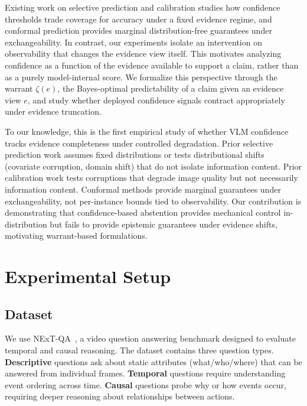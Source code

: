 \documentclass{article}
\begin{document}
Existing work on selective prediction and calibration studies how confidence thresholds trade coverage for accuracy under a fixed evidence regime, and conformal prediction provides marginal distribution-free guarantees under exchangeability. In contrast, our experiments isolate an intervention on observability that changes the evidence view itself. This motivates analyzing confidence as a function of the evidence available to support a claim, rather than as a purely model-internal score. We formalize this perspective through the warrant $\zeta(e)$, the Bayes-optimal predictability of a claim given an evidence view $e$, and study whether deployed confidence signals contract appropriately under evidence truncation.

To our knowledge, this is the first empirical study of whether VLM confidence tracks evidence completeness under controlled degradation. Prior selective prediction work assumes fixed distributions or tests distributional shifts (covariate corruption, domain shift) that do not isolate information content. Prior calibration work tests corruptions that degrade image quality but not necessarily information content. Conformal methods provide marginal guarantees under exchangeability, not per-instance bounds tied to observability. Our contribution is demonstrating that confidence-based abstention provides mechanical control in-distribution but fails to provide epistemic guarantees under evidence shifts, motivating warrant-based formulations.

\section{Experimental Setup}

\subsection{Dataset}

We use NExT-QA~\citep{nextqa}, a video question answering benchmark designed to evaluate temporal and causal reasoning. The dataset contains three question types. \textbf{Descriptive} questions ask about static attributes (what/who/where) that can be answered from individual frames. \textbf{Temporal} questions require understanding event ordering across time. \textbf{Causal} questions probe why or how events occur, requiring deeper reasoning about relationships between actions.
\end{document}
